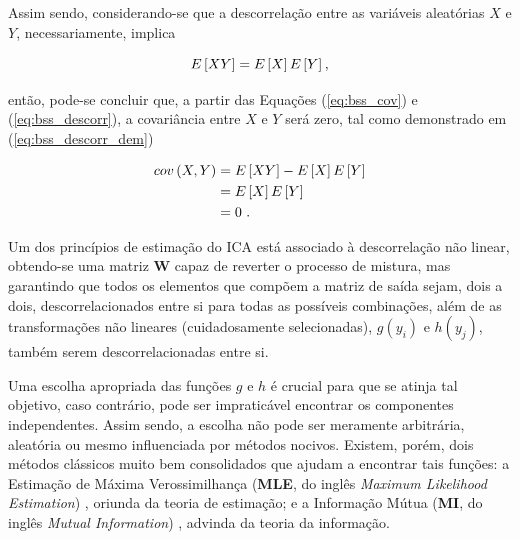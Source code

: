 Assim sendo, considerando-se que a descorrelação entre as variáveis aleatórias $X$ e $Y$, necessariamente, implica

\begin{equation}
    E\left[XY\right] = E\left[X\right] E\left[Y\right]
    \hspace{0.01cm},
    \vspace{0.2cm}
    \label{eq:bss_descorr}
\end{equation}

\noindent então, pode-se concluir que, a partir das Equações (\ref{eq:bss_cov}) e (\ref{eq:bss_descorr}), a covariância entre $X$ e $Y$ será zero, tal como demonstrado em (\ref{eq:bss_descorr_dem})

\begin{equation}
\begin{aligned}
    cov\left(X, Y\right) & = E\left[XY\right] - E\left[X\right] E\left[Y\right] \\
    & = E\left[X\right] E\left[Y\right] \\
    & = 0 \hspace{0.01cm}
    \hspace{0.1cm}.
    \vspace{0.2cm}
    \label{eq:bss_descorr_dem}
\end{aligned}
\vspace{0.2cm}
\end{equation}

Um dos princípios de estimação do ICA está associado à descorrelação não linear, obtendo-se uma matriz $\mathbf{W}$ capaz de reverter o processo de mistura, mas garantindo que todos os elementos que compõem a matriz de saída sejam, dois a dois, descorrelacionados entre si para todas as possíveis combinações, além de as transformações não lineares (cuidadosamente selecionadas), $g(y_{i})$ e $h(y_{j})$, também serem descorrelacionadas entre si.

Uma escolha apropriada das funções $g$ e $h$ é crucial para que se atinja tal objetivo, caso contrário, pode ser impraticável encontrar os componentes independentes. Assim sendo, a escolha não pode ser meramente arbitrária, aleatória ou mesmo influenciada por métodos nocivos. Existem, porém, dois métodos clássicos muito bem consolidados que ajudam a encontrar tais funções: a Estimação de Máxima Verossimilhança (\textbf{MLE}, do inglês \textit{Maximum Likelihood Estimation}) \citep{ra1922mathematical, aldrich1997ra}, oriunda da teoria de estimação; e a Informação Mútua (\textbf{MI}, do inglês \textit{Mutual Information}) \citep{cover2012elements}, advinda da teoria da informação.

